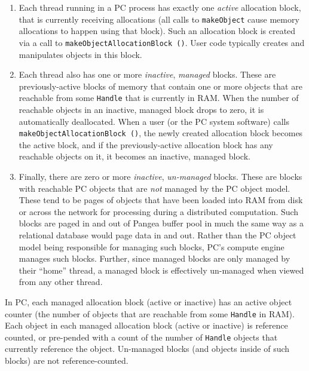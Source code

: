 \begin{enumerate}

\item Each thread running in a PC process has exactly one \emph{active} allocation block, that is currently receiving allocations (all calls to
\texttt{makeObject} cause memory allocations to happen using that block).  Such an allocation block is created via a call to 
\texttt{makeObjectAllocationBlock ()}.  User code typically creates and manipulates objects in this block.

\item Each thread also has one or more
\emph{inactive}, \emph{managed} blocks.  These are previously-active blocks of memory that contain one or more objects that are reachable
from some \texttt{Handle} that is currently in RAM.  When the number of reachable objects in an inactive, managed block drops to zero, it is automatically
deallocated.
When a user (or the PC system software) calls 
\texttt{makeObjectAllocationBlock ()}, the newly created allocation block becomes the active block, and if the previously-active allocation block has any
reachable objects on it, it becomes an inactive, managed block.

\item Finally, there are zero or more \emph{inactive},
  \emph{un-managed} blocks.  These are blocks with reachable PC
  objects that are \emph{not} managed by the PC object model.  These tend to be pages of objects that have
been loaded into RAM from disk or across the network for processing
during a distributed computation.  Such blocks are paged in and out of Pangea
buffer pool in much the same way as a relational database would page data in and out.
Rather than the PC object model being responsible for managing such blocks, PC's compute engine manages such blocks.
Further, since managed blocks are only managed by their ``home'' thread, a managed block is effectively un-managed when viewed from
any other thread.

\end{enumerate}

In PC, each managed allocation block (active or inactive) has an active object counter (the number of objects that are reachable
from some \texttt{Handle} in RAM).  Each object in each managed allocation block (active or inactive) is reference counted, or pre-pended with a count of
the number of \texttt{Handle} objects that currently reference the object.  
Un-managed blocks (and objects inside of such blocks) are not reference-counted.

